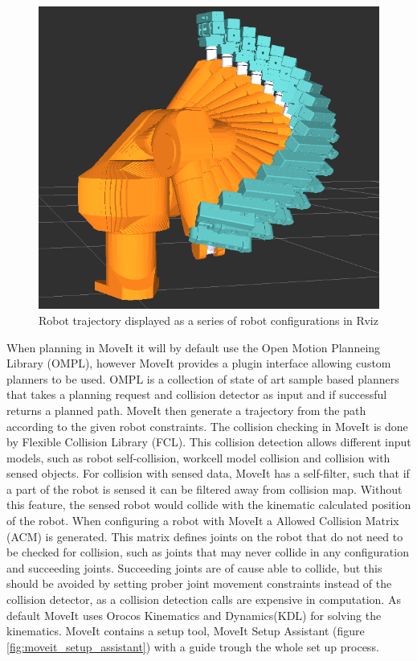 \begin{figure}[htb]
	\begin{center}
		\includegraphics[scale=0.5,trim=0 0 0 0]{graphics/05_robotics/robot_trajectory.png}%
		\caption{Robot trajectory displayed as a series of robot configurations in Rviz}
		\label{fig:robot_trajectory}
	\end{center}
\end{figure}

When planning in MoveIt it will by default use the Open Motion Planneing Library (OMPL), however MoveIt provides a plugin interface allowing custom planners to be used. OMPL is a collection of state of art sample based planners that takes a planning request and collision detector as input and if successful returns a planned path. MoveIt then generate a trajectory from the path according to the given robot constraints. The collision checking in MoveIt is done by Flexible Collision Library (FCL). This collision detection allows different input models, such as robot self-collision, workcell model collision and collision with sensed objects. For collision with sensed data, MoveIt has a self-filter, such that if a part of the robot is sensed it can be filtered away from collision map. Without this feature, the sensed robot would collide with the kinematic calculated position of the robot. When configuring a robot with MoveIt a Allowed Collision Matrix (ACM) is generated. This matrix defines joints on the robot that do not need to be checked for collision, such as joints that may never collide in any configuration and succeeding joints. Succeeding joints are of cause able to collide, but this should be avoided by setting prober joint movement constraints instead of the collision detector, as a collision detection calls are expensive in computation. As default MoveIt uses Orocos Kinematics and Dynamics(KDL) for solving the kinematics. MoveIt contains a setup tool, MoveIt Setup Assistant (figure \ref{fig:moveit_setup_assistant}) with a guide trough the whole set up process.

